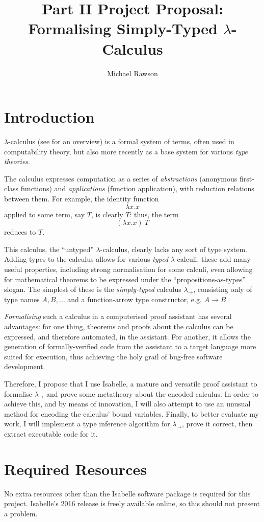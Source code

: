 \documentclass[12pt]{article}
\title{Part II Project Proposal: Formalising Simply-Typed \(\lambda\)-Calculus}
\author{Michael Rawson}
\begin{document}


\section*{Introduction}
\(\lambda\)-calculus (see \parencite{lambda-overview} for an overview) is a formal system of terms, often used in computability theory, but also more recently as a base system for various \emph{type theories}.

The calculus expresses computation as a series of \emph{abstractions} (anonymous first-class functions) and \emph{applications} (function application), with reduction relations between them.
For example, the identity function
\[
\lambda x.x
\]
applied to some term, say \(T\), is clearly \(T\): thus, the term
\[
(\lambda x.x)\ T
\]
reduces to \(T\).

This calculus, the ``untyped'' \(\lambda\)-calculus, clearly lacks any sort of type system.
Adding types to the calculus allows for various \emph{typed} \(\lambda\)-calculi: these add many useful properties, including strong normalisation for some calculi\parencite{strong-normalisation}, even allowing for mathematical theorems to be expressed under the ``propositions-as-types'' slogan\parencite{curry-howard}.
The simplest of these is the \emph{simply-typed} calculus \(\lambda_\to\), consisting only of type names \(A, B, \ldots\) and a function-arrow type constructor, e.g. \(A \to B\).

\emph{Formalising} such a calculus in a computerised proof assistant has several advantages: for one thing, theorems and proofs about the calculus can be expressed, and therefore automated, in the assistant.
For another, it allows the generation of formally-verified code from the assistant to a target language more suited for execution, thus achieving the holy grail of bug-free software development.

Therefore, I propose that I use Isabelle, a mature and versatile proof assistant \parencite{isabelle-overview} to formalise \(\lambda_\to\) and prove some metatheory about the encoded calculus.
In order to achieve this, and by means of innovation, I will also attempt to use an unusual method for encoding the calculus' bound variables.
Finally, to better evaluate my work, I will implement a type inference algorithm for \(\lambda_\to\), prove it correct, then extract executable code for it.

\section*{Required Resources}
No extra resources other than the Isabelle software package is required for this project.
Isabelle's 2016 release is freely available online\parencite{isabelle-installation}, so this should not present a problem.
\end{document}
